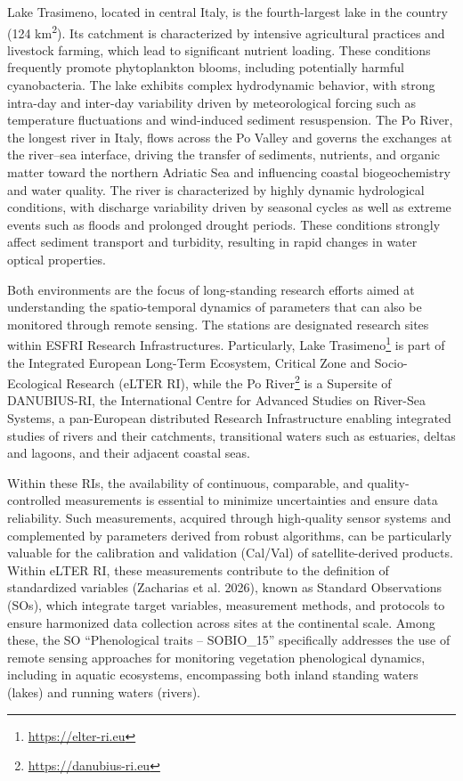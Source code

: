 \documentclass[
]{article}
\begin{document}
Lake Trasimeno, located in central Italy, is the fourth-largest lake in
the country (124 km\textsuperscript{2}). Its catchment is characterized
by intensive agricultural practices and livestock farming, which lead to
significant nutrient loading. These conditions frequently promote
phytoplankton blooms, including potentially harmful cyanobacteria. The
lake exhibits complex hydrodynamic behavior, with strong intra-day and
inter-day variability driven by meteorological forcing such as
temperature fluctuations and wind-induced sediment resuspension. The Po
River, the longest river in Italy, flows across the Po Valley and
governs the exchanges at the river--sea interface, driving the transfer
of sediments, nutrients, and organic matter toward the northern Adriatic
Sea and influencing coastal biogeochemistry and water quality. The river
is characterized by highly dynamic hydrological conditions, with
discharge variability driven by seasonal cycles as well as extreme
events such as floods and prolonged drought periods. These conditions
strongly affect sediment transport and turbidity, resulting in rapid
changes in water optical properties.

Both environments are the focus of long-standing research efforts aimed
at understanding the spatio-temporal dynamics of parameters that can
also be monitored through remote sensing. The stations are designated
research sites within ESFRI Research Infrastructures. Particularly, Lake
Trasimeno\footnote{\url{https://elter-ri.eu}} is part of the Integrated
European Long-Term Ecosystem, Critical Zone and Socio-Ecological
Research (eLTER RI), while the Po River\footnote{\url{https://danubius-ri.eu}}
is a Supersite of DANUBIUS-RI, the International Centre for Advanced
Studies on River-Sea Systems, a pan-European distributed Research
Infrastructure enabling integrated studies of rivers and their
catchments, transitional waters such as estuaries, deltas and lagoons,
and their adjacent coastal seas.

Within these RIs, the availability of continuous, comparable, and
quality-controlled measurements is essential to minimize uncertainties
and ensure data reliability. Such measurements, acquired through
high-quality sensor systems and complemented by parameters derived from
robust algorithms, can be particularly valuable for the calibration and
validation (Cal/Val) of satellite-derived products. Within eLTER RI,
these measurements contribute to the definition of standardized
variables (Zacharias et al. 2026), known as Standard Observations (SOs),
which integrate target variables, measurement methods, and protocols to
ensure harmonized data collection across sites at the continental scale.
Among these, the SO ``Phenological traits -- SOBIO\_15'' specifically
addresses the use of remote sensing approaches for monitoring vegetation
phenological dynamics, including in aquatic ecosystems, encompassing
both inland standing waters (lakes) and running waters (rivers).
\end{document}
